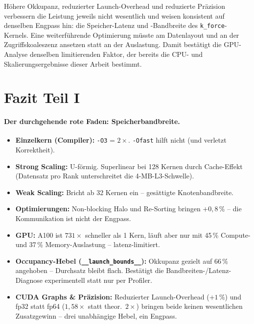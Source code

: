 \documentclass[11pt,a4paper]{article}
\newcommand{\infobox}[2]{%
  \begin{tcolorbox}[colback=orange!5,colframe=orange!60!black,boxrule=0.4pt,
                    arc=2pt,title={\small\textbf{#1}}]
    \small #2
  \end{tcolorbox}%
}
\begin{document}
\infobox{Fazit: drei Hebel, ein Engpass}{%
  Höhere Okkupanz, reduzierter Launch-Overhead und reduzierte Präzision
  verbessern die Leistung jeweils nicht wesentlich und weisen konsistent auf
  denselben Engpass hin: die Speicher-Latenz und -Bandbreite des
  \texttt{k\_force}-Kernels. Eine weiterführende Optimierung müsste am
  Datenlayout und an der Zugriffskoaleszenz ansetzen statt an der
  Auslastung. Damit bestätigt die GPU-Analyse denselben limitierenden
  Faktor, der bereits die CPU- und Skalierungsergebnisse dieser Arbeit
  bestimmt.
}

\FloatBarrier   %

\section{Fazit Teil I}
\label{sec:fazit-hpc}

\paragraph{Der durchgehende rote Faden: Speicherbandbreite.}

\begin{itemize}[itemsep=2pt]
\item \textbf{Einzelkern (Compiler):} \texttt{-O3} = $2\times$. \texttt{-Ofast}
  hilft nicht (und verletzt Korrektheit).
\item \textbf{Strong Scaling:} U-förmig. Superlinear bei 128 Kernen durch
  Cache-Effekt (Datensatz pro Rank unterschreitet die 4-MB-L3-Schwelle).
\item \textbf{Weak Scaling:} Bricht ab 32 Kernen ein -- ges\"attigte Knotenbandbreite.
\item \textbf{Optimierungen:} Non-blocking Halo und Re-Sorting bringen $+0{,}8\,\%$ --
  die Kommunikation ist nicht der Engpass.
\item \textbf{GPU:} A100 ist $731\times$ schneller als 1 Kern, läuft aber nur
  mit 45\,\% Compute- und 37\,\% Memory-Auslastung -- latenz-limitiert.
\item \textbf{Occupancy-Hebel (\texttt{\_\_launch\_bounds\_\_}):} Okkupanz
  gezielt auf 66\,\% angehoben -- Durchsatz bleibt flach. Bestätigt die
  Bandbreiten-/Latenz-Diagnose experimentell statt nur per Profiler.
\item \textbf{CUDA Graphs \& Präzision:} Reduzierter Launch-Overhead
  ($+1\,\%$) und fp32 statt fp64 ($1{,}58\times$ statt theor.\ $2\times$)
  bringen beide keinen wesentlichen Zusatzgewinn -- drei unabhängige Hebel,
  ein Engpass.
\end{itemize}
\end{document}
